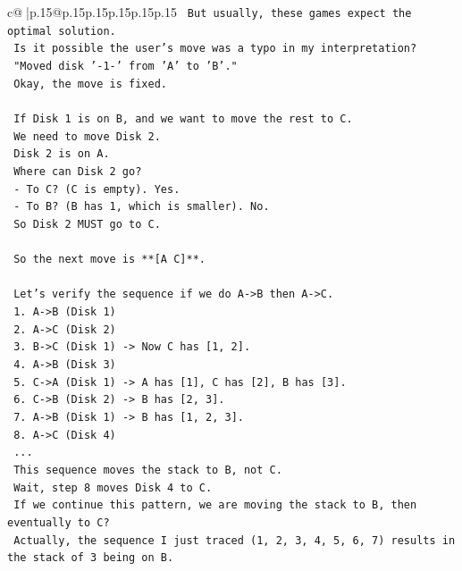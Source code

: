 \documentclass{article}
\begin{document}
{\begin{supertabular}{c@{$\;$}|p{.15\linewidth}@{}p{.15\linewidth}p{.15\linewidth}p{.15\linewidth}p{.15\linewidth}p{.15\linewidth}}
{{{\texttt{    But usually, these games expect the optimal solution.} \\
\texttt{    Is it possible the user's move was a typo in my interpretation?} \\
\texttt{    "Moved disk '{-}1{-}' from 'A' to 'B'."} \\
\texttt{    Okay, the move is fixed.} \\
\\ 
\texttt{    If Disk 1 is on B, and we want to move the rest to C.} \\
\texttt{    We need to move Disk 2.} \\
\texttt{    Disk 2 is on A.} \\
\texttt{    Where can Disk 2 go?} \\
\texttt{    {-} To C? (C is empty). Yes.} \\
\texttt{    {-} To B? (B has 1, which is smaller). No.} \\
\texttt{    So Disk 2 MUST go to C.} \\
\\ 
\texttt{    So the next move is **{[}A C{]}**.} \\
\\ 
\texttt{    Let's verify the sequence if we do A{-}>B then A{-}>C.} \\
\texttt{    1. A{-}>B (Disk 1)} \\
\texttt{    2. A{-}>C (Disk 2)} \\
\texttt{    3. B{-}>C (Disk 1) {-}> Now C has {[}1, 2{]}.} \\
\texttt{    4. A{-}>B (Disk 3)} \\
\texttt{    5. C{-}>A (Disk 1) {-}> A has {[}1{]}, C has {[}2{]}, B has {[}3{]}.} \\
\texttt{    6. C{-}>B (Disk 2) {-}> B has {[}2, 3{]}.} \\
\texttt{    7. A{-}>B (Disk 1) {-}> B has {[}1, 2, 3{]}.} \\
\texttt{    8. A{-}>C (Disk 4)} \\
\texttt{    ...} \\
\texttt{    This sequence moves the stack to B, not C.} \\
\texttt{    Wait, step 8 moves Disk 4 to C.} \\
\texttt{    If we continue this pattern, we are moving the stack to B, then eventually to C?} \\
\texttt{    Actually, the sequence I just traced (1, 2, 3, 4, 5, 6, 7) results in the stack of 3 being on B.} \\
}}}
\end{supertabular}}
\end{document}
